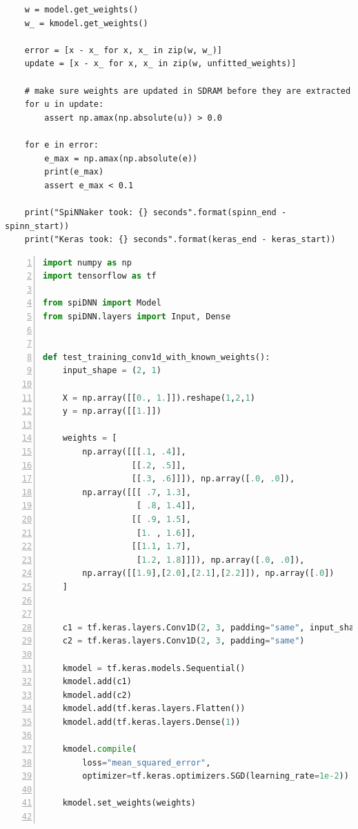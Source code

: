 \documentclass[]{article}
\begin{document}
\begin{appendices}
\begin{lstlisting}
    w = model.get_weights()
    w_ = kmodel.get_weights()

    error = [x - x_ for x, x_ in zip(w, w_)]
    update = [x - x_ for x, x_ in zip(w, unfitted_weights)]

    # make sure weights are updated in SDRAM before they are extracted
    for u in update:
        assert np.amax(np.absolute(u)) > 0.0

    for e in error:
        e_max = np.amax(np.absolute(e))
        print(e_max)
        assert e_max < 0.1

    print("SpiNNaker took: {} seconds".format(spinn_end - spinn_start))
    print("Keras took: {} seconds".format(keras_end - keras_start))
\end{lstlisting}

\newpage

\begin{lstlisting}[language=Python, caption={Excerpt from the test
  suite showing the training of a \acrshort{cnn} with known weights.
  It was used for implementing backpropagation for convolutional
  layer.}, captionpos=b, numbers=left,
  label={lst:cnn_known_weights}]
import numpy as np
import tensorflow as tf

from spiDNN import Model
from spiDNN.layers import Input, Dense


def test_training_conv1d_with_known_weights():
    input_shape = (2, 1)

    X = np.array([[0., 1.]]).reshape(1,2,1)
    y = np.array([[1.]])

    weights = [
        np.array([[[.1, .4]],
                  [[.2, .5]],
                  [[.3, .6]]]), np.array([.0, .0]),
        np.array([[[ .7, 1.3],
                   [ .8, 1.4]],
                  [[ .9, 1.5],
                   [1. , 1.6]],
                  [[1.1, 1.7],
                   [1.2, 1.8]]]), np.array([.0, .0]),
        np.array([[1.9],[2.0],[2.1],[2.2]]), np.array([.0])
    ]


    c1 = tf.keras.layers.Conv1D(2, 3, padding="same", input_shape=input_shape)
    c2 = tf.keras.layers.Conv1D(2, 3, padding="same")

    kmodel = tf.keras.models.Sequential()
    kmodel.add(c1)
    kmodel.add(c2)
    kmodel.add(tf.keras.layers.Flatten())
    kmodel.add(tf.keras.layers.Dense(1))

    kmodel.compile(
        loss="mean_squared_error",
        optimizer=tf.keras.optimizers.SGD(learning_rate=1e-2))

    kmodel.set_weights(weights)


\end{lstlisting}
\end{appendices}
\end{document}
